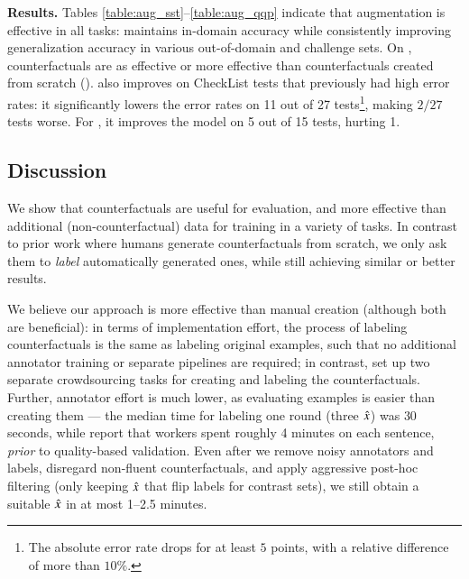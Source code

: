 \textbf{Results.}
Tables \ref{table:aug_sst}--\ref{table:aug_qqp} indicate that \sysname augmentation is effective in all tasks: \maug maintains in-domain accuracy while consistently improving generalization accuracy in various out-of-domain and challenge sets. 
On \nli, \sysname counterfactuals are as effective or more effective than counterfactuals created from scratch (\mcad).
\sysname also improves on CheckList tests that previously had high error rates: 
it significantly lowers the error rates on 11 out of 27 \qqp tests\footnote{The absolute error rate drops for at least $5$ points, with a relative difference of more than $10\%$.}, making $2/27$ tests worse.
For \sst, it improves the model on 5 out of 15 tests, hurting 1.


\subsection{Discussion}
\label{subsec:label_efficiency}
We show that \sysname counterfactuals are useful for evaluation, and more effective than additional (non-counterfactual) data for training in a variety of tasks. 
In contrast to prior work where humans generate counterfactuals from scratch, we only ask them to \emph{label} automatically generated ones, while still achieving similar or better results.

We believe our approach is more effective than manual creation (although both are beneficial): in terms of implementation effort, the process of labeling counterfactuals is the same as labeling original examples, such that no additional annotator training or separate pipelines are required; in contrast, \citet{kaushik2019learning} set up two separate crowdsourcing tasks for creating and labeling the counterfactuals.
Further, annotator effort is much lower, as evaluating examples is easier than creating them --- the median time for labeling one round (three $\hat{x}$) was $30$ seconds, while \citet{kaushik2019learning} report that workers spent roughly 4 minutes on each \nli sentence, \emph{prior} to quality-based validation.
Even after we remove noisy annotators and labels, disregard non-fluent counterfactuals, and apply aggressive post-hoc filtering (\eg only keeping $\hat{x}$ that flip labels for contrast sets), we still obtain a suitable $\hat{x}$ in at most 1--2.5 minutes.

